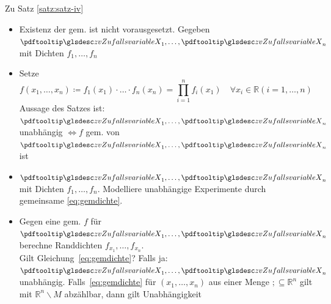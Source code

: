\begin{bem}
    Zu Satz \autoref{satz:satz-iv}  \\
    \begin{itemize}
        \item Existenz der gem. \dichte ist nicht vorausgesetzt.
        Gegeben $\zvx_1, \dots, \zvx_n$ mit Dichten  $f_1, \dots, f_n$
        \item Setze
        \begin{equation}
            \label{eq:gemdichte}
            f(x_1, \dots, x_n) \coloneqq  f_1(x_1) \cdot \dots \cdot f_n(x_n) = \prod^n_{i=1} f_i(x_1) \quad \forall
            x_i \in
            \mathbb{R} (i=1, \dots, n)
        \end{equation}
        Aussage des Satzes ist: $\zvx_1, \dots, \zvx_n$ unabhängig $\Leftrightarrow f$ gem. \dichte von $\zvx_1, \dots, \zvx_n$ ist
        \item $\zvx_1, \dots, \zvx_n$ mit Dichten  $f_1, \dots, f_n$.
        Modelliere unabhängige Experimente durch gemeinsame \dichte \eqref{eq:gemdichte}.
        \item Gegen eine gem. \dichte $f$ für $\zvx_1, \dots, \zvx_n$ berechne Randdichten $f_{x_1}, \dots, f_{x_n}$. \\
        Gilt Gleichung~\eqref{eq:gemdichte}? Falls ja: $\zvx_1, \dots, \zvx_n$ unabhängig.
        Falls~\eqref{eq:gemdichte} für $(x_1, \dots, x_n)$ aus einer Menge $; \subseteq \mathbb{R}^n$ gilt mit $\mathbb{R}^n\backslash M$ abzählbar, dann gilt Unabhängigkeit
    \end{itemize}
\end{bem}





